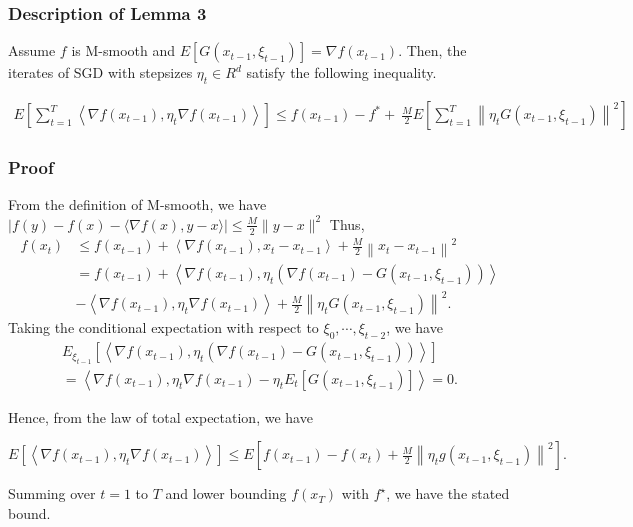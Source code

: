 \documentclass[14pt,onecolumn,letterpaper]{extarticle}
\begin{document}
\subsubsection{Description of Lemma 3}
Assume $f$ is M-smooth and $E[G(x_{t-1},\xi_{t-1})]=\nabla f(x_{t-1})$. 
Then, the iterates of SGD with stepsizes $\eta_t \in R^{d}$ satisfy the following inequality. \par\vspace{3mm}
$\begin{aligned} E\left[\sum_{t=1}^T\left\langle\nabla f\left(x_{t-1}\right), \eta_t \nabla f\left(x_{t-1}\right)\right\rangle\right] \leq f\left(x_{t-1}\right)-f^*  +\ \frac{M}{2} E\left[\sum_{t=1}^T\left\|\eta_t G\left(x_{t-1}, \xi_{t-1}\right)\right\|^2\right]\end{aligned}$
\subsubsection{Proof}
From the definition of M-smooth, we have
$|f(y)-f(x)-\langle\nabla f(x), y-x\rangle| \leq \frac{M}{2}\|y-x\|^2$
Thus,
$$
\begin{aligned}
f\left(x_{t}\right) & \leq f\left(x_{t-1}\right)+\left\langle\nabla f\left(x_{t-1}\right), {x}_{t}-{x}_{t-1}\right\rangle+\frac{M}{2}\left\|{x}_{t}-{x}_{t-1}\right\|^2 \\
& =f\left({x}_{t-1}\right)+\left\langle\nabla f\left({x}_{t-1}\right), {\eta}_t\left(\nabla f\left({x}_{t-1}\right)-{G}\left({x}_{t-1}, \xi_{t-1}\right)\right)\right\rangle \\ &-\left\langle\nabla f\left({x}_{t-1}\right), {\eta}_t \nabla f\left({x}_{t-1}\right)\right\rangle+\frac{M}{2}\left\|{\eta}_t {G}\left({x}_{t-1}, \xi_{t-1}\right)\right\|^2 .
\end{aligned}
$$
Taking the conditional expectation with respect to $\xi_0, \cdots, \xi_{t-2}$, we have\\
\begin{align*}
E_{\xi_{t-1}}\left[\left\langle\nabla f\left({x}_{t-1}\right), {\eta}_t\left(\nabla f\left({x}_{t-1}\right)-{G}\left({x}_{t-1}, \xi_{t-1}\right)\right)\right\rangle\right]\\
=\left\langle\nabla f\left({x}_{t-1}\right), {\eta}_t \nabla f\left({x}_{t-1}\right)-{\eta}_t {E}_t\left[{G}\left({x}_{t-1}, \xi_{t-1}\right)\right]\right\rangle=0 .
\end{align*}
\par\vspace{2mm}
Hence, from the law of total expectation, we have\par\vspace{3mm}
$
{E}\left[\left\langle\nabla f\left({x}_{t-1}\right), {\eta}_t \nabla f\left({x}_{t-1}\right)\right\rangle\right] \leq {E}\left[f\left({x}_{t-1}\right)-f\left({x}_{t}\right)+\frac{M}{2}\left\|{\eta}_t {g}\left({x}_{t-1}, \xi_{t-1}\right)\right\|^2\right] .
$\par\vspace{3mm}
Summing over $t=1$ to $T$ and lower bounding $f\left({x}_{T}\right)$ with $f^{\star}$, we have the stated bound.
\end{document}
